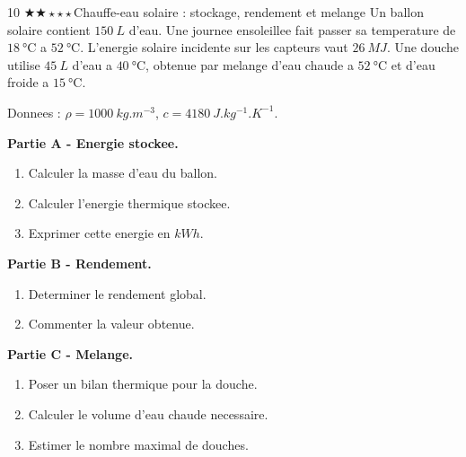 \documentclass[11pt,a4paper]{article}
\newcommand{\difftwo}{\(\bigstar\bigstar\star\star\star\)}
\begin{document}
\begin{probleme}{10 \difftwo}{Chauffe-eau solaire : stockage, rendement et melange}
Un ballon solaire contient \(\SI{150}{L}\) d'eau. Une journee ensoleillee fait passer sa temperature de \(\SI{18}{\celsius}\) a \(\SI{52}{\celsius}\). L'energie solaire incidente sur les capteurs vaut \(\SI{26}{MJ}\). Une douche utilise \(\SI{45}{L}\) d'eau a \(\SI{40}{\celsius}\), obtenue par melange d'eau chaude a \(\SI{52}{\celsius}\) et d'eau froide a \(\SI{15}{\celsius}\).

Donnees : \(\rho=\SI{1000}{kg.m^{-3}}\), \(c=\SI{4180}{J.kg^{-1}.K^{-1}}\).

\textbf{Partie A - Energie stockee.}
\begin{enumerate}
\item Calculer la masse d'eau du ballon.
\item Calculer l'energie thermique stockee.
\item Exprimer cette energie en \(\si{kWh}\).
\end{enumerate}

\textbf{Partie B - Rendement.}
\begin{enumerate}[resume]
\item Determiner le rendement global.
\item Commenter la valeur obtenue.
\end{enumerate}

\textbf{Partie C - Melange.}
\begin{enumerate}[resume]
\item Poser un bilan thermique pour la douche.
\item Calculer le volume d'eau chaude necessaire.
\item Estimer le nombre maximal de douches.
\end{enumerate}
\end{probleme}
\end{document}
